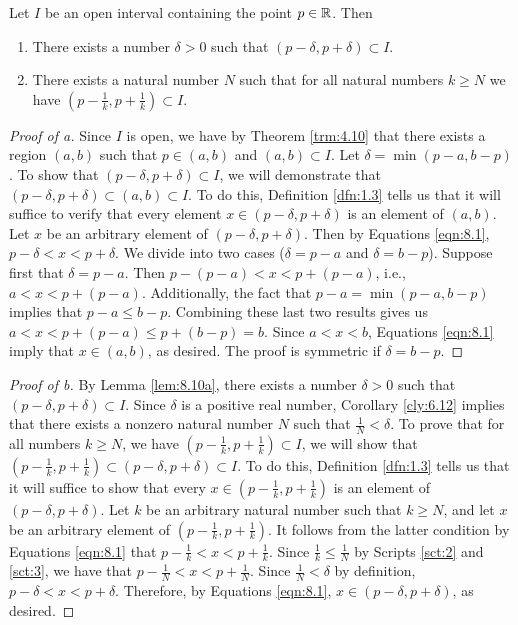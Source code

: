 \documentclass[../main.tex]{subfiles}
\begin{document}
\begin{lemma}\label{lem:8.10}
    Let $I$ be an open interval containing the point $p\in\mathbb{R}$. Then
    \begin{enumerate}[label={\alph*\textup{)}},ref={\thelemma\alph*}]
        \item \label{lem:8.10a}There exists a number $\delta>0$ such that $(p-\delta,p+\delta)\subset I$.
        \item \label{lem:8.10b}There exists a natural number $N$ such that for all natural numbers $k\geq N$ we have $(p-\frac{1}{k},p+\frac{1}{k})\subset I$.
    \end{enumerate}
    \begin{proof}[Proof of a]
        Since $I$ is open, we have by Theorem \ref{trm:4.10} that there exists a region $(a,b)$ such that $p\in(a,b)$ and $(a,b)\subset I$. Let $\delta=\min(p-a,b-p)$. To show that $(p-\delta,p+\delta)\subset I$, we will demonstrate that $(p-\delta,p+\delta)\subset(a,b)\subset I$. To do this, Definition \ref{dfn:1.3} tells us that it will suffice to verify that every element $x\in(p-\delta,p+\delta)$ is an element of $(a,b)$. Let $x$ be an arbitrary element of $(p-\delta,p+\delta)$. Then by Equations \ref{eqn:8.1}, $p-\delta<x<p+\delta$. We divide into two cases ($\delta=p-a$ and $\delta=b-p$). Suppose first that $\delta=p-a$. Then $p-(p-a)<x<p+(p-a)$, i.e., $a<x<p+(p-a)$. Additionally, the fact that $p-a=\min(p-a,b-p)$ implies that $p-a\leq b-p$. Combining these last two results gives us $a<x<p+(p-a)\leq p+(b-p)=b$. Since $a<x<b$, Equations \ref{eqn:8.1} imply that $x\in(a,b)$, as desired. The proof is symmetric if $\delta=b-p$.
    \end{proof}
    \begin{proof}[Proof of b]
        By Lemma \ref{lem:8.10a}, there exists a number $\delta>0$ such that $(p-\delta,p+\delta)\subset I$. Since $\delta$ is a positive real number, Corollary \ref{cly:6.12} implies that there exists a nonzero natural number $N$ such that $\frac{1}{N}<\delta$. To prove that for all numbers $k\geq N$, we have $(p-\frac{1}{k},p+\frac{1}{k})\subset I$, we will show that $(p-\frac{1}{k},p+\frac{1}{k})\subset(p-\delta,p+\delta)\subset I$. To do this, Definition \ref{dfn:1.3} tells us that it will suffice to show that every $x\in(p-\frac{1}{k},p+\frac{1}{k})$ is an element of $(p-\delta,p+\delta)$. Let $k$ be an arbitrary natural number such that $k\geq N$, and let $x$ be an arbitrary element of $(p-\frac{1}{k},p+\frac{1}{k})$. It follows from the latter condition by Equations \ref{eqn:8.1} that $p-\frac{1}{k}<x<p+\frac{1}{k}$. Since $\frac{1}{k}\leq\frac{1}{N}$ by Scripts \ref{sct:2} and \ref{sct:3}, we have that $p-\frac{1}{N}<x<p+\frac{1}{N}$. Since $\frac{1}{N}<\delta$ by definition, $p-\delta<x<p+\delta$. Therefore, by Equations \ref{eqn:8.1}, $x\in(p-\delta,p+\delta)$, as desired.
    \end{proof}
\end{lemma}
\end{document}
